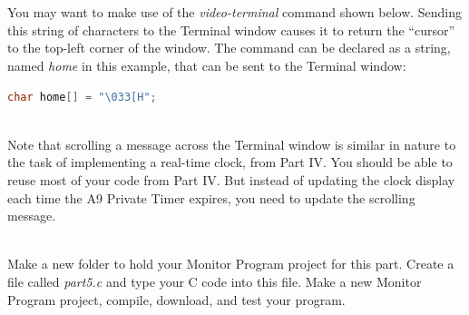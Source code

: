 \documentclass[epsfig,10pt,fullpage]{article}
\newcommand{\CommonDocsPath}{../../../../common/docs}
\begin{document}
~\\
~\\
\noindent
You may want to make use of the {\it video-terminal} command shown below.
Sending this string of characters to the Terminal window causes it to return the ``cursor'' to 
the top-left corner of the window. The command can be declared as a string, named {\it home} in
this example, that can be sent to the Terminal window:

\begin{lstlisting}[language=C]
char home[] = "\033[H";
\end{lstlisting}

~\\
Note that scrolling a message across the Terminal window is similar in nature to the 
task of implementing a real-time clock, from Part IV. You should be able to reuse most of 
your code from Part IV. But instead of updating the clock display each time the A9 Private Timer
expires, you need to update the scrolling message.  

~\\
\noindent
Make a new folder to hold your Monitor Program project for this part. Create a
file called {\it part5.c} and type your C code into this file.  Make a new Monitor Program 
project, compile, download, and test your program. 





\end{document}
